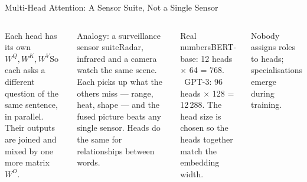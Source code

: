 \documentclass[aspectratio=169,10pt]{beamer}
\begin{document}
\begin{frame}{Multi-Head Attention: A Sensor Suite, Not a Single Sensor}
\begin{columns}[T]
\begin{cbox}{Each head has its own $W^Q,W^K,W^V$}\scriptsize So each asks a different question of the same sentence, in parallel. Their outputs are joined and mixed by one more matrix $W^O$.\end{cbox}
\begin{cbox}{Analogy: a surveillance sensor suite}\scriptsize Radar, infrared and a camera watch the same scene. Each picks up what the others miss --- range, heat, shape --- and the fused picture beats any single sensor. Heads do the same for relationships between words.\end{cbox}
\begin{cbox}[ISSAnavy]{Real numbers}\scriptsize BERT-base: 12 heads $\times$ 64 = 768. \ GPT-3: 96 heads $\times$ 128 = 12\,288. The head size is chosen so the heads together match the embedding width.\end{cbox}
\begin{ibox}\scriptsize Nobody assigns roles to heads; specialisations emerge during training.\end{ibox}
\end{columns}
\end{frame}
\end{document}
